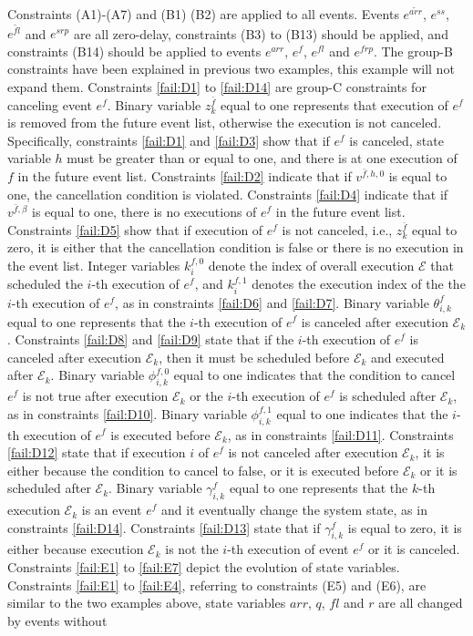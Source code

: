 \documentclass[]{interact}
\theoremstyle{plain}%
\theoremstyle{definition}
\theoremstyle{remark}
\begin{document}
Constraints (A1)-(A7) and (B1) (B2) are applied to all events. Events $e^{\tilde{arr}}$, $e^{ss}$, $e^{\tilde{fl}}$ and $e^{srp}$ are all zero-delay, constraints (B3) to (B13) should be applied, and constraints (B14) should be applied to events $e^{arr}$, $e^{f}$, $e^{fl}$ and $e^{frp}$. The group-B constraints have been explained in previous two examples, this example will not expand them. Constraints \eqref{fail:D1} to \eqref{fail:D14} are group-C constraints for canceling event $e^{f}$. Binary variable $z^{\bar{f}}_k$ equal to one represents that execution of $e^{f}$ is removed from the future event list, otherwise the execution is not canceled. Specifically, constraints \eqref{fail:D1} and \eqref{fail:D3} show that if $e^{f}$ is canceled, state variable $h$ must be greater than or equal to one, and there is at one execution of $f$ in the future event list. Constraints \eqref{fail:D2} indicate that if $v^{\bar{f},h,0}$ is equal to one, the cancellation condition is violated. Constraints \eqref{fail:D4} indicate that if $v^{\bar{f},\beta}$ is equal to one, there is no executions of $e^{f}$ in the future event list. Constraints \eqref{fail:D5} show that if execution of $e^{f}$ is not canceled, i.e., $z^{\bar{f}}_k$ equal to zero, it is either that the cancellation condition is false or there is no execution in the event list. Integer variables $k^{f,0}_i$ denote the index of overall execution $\mathcal{E}$ that scheduled the $i$-th execution of $e^{f}$, and $k^{f,1}_i$ denotes the execution index of the the $i$-th execution of $e^{f}$, as in constraints \eqref{fail:D6} and \eqref{fail:D7}. Binary variable $\theta^{f}_{i,k}$ equal to one represents that the $i$-th execution of $e^{f}$ is canceled after execution $\mathcal{E}_k$. Constraints \eqref{fail:D8} and \eqref{fail:D9} state that if the $i$-th execution of $e^{f}$ is canceled after execution $\mathcal{E}_k$, then it must be scheduled before $\mathcal{E}_k$ and executed after $\mathcal{E}_k$. Binary variable $\phi^{f,0}_{i,k}$ equal to one indicates that the condition to cancel $e^{f}$ is not true after execution $\mathcal{E}_k$ or the $i$-th execution of $e^{f}$ is scheduled after $\mathcal{E}_k$, as in constraints \eqref{fail:D10}. Binary variable $\phi^{f,1}_{i,k}$ equal to one indicates that the $i$-th execution of $e^{f}$ is executed before $\mathcal{E}_k$, as in constraints \eqref{fail:D11}. Constraints \eqref{fail:D12} state that if execution $i$ of $e^{f}$ is not canceled after execution $\mathcal{E}_k$, it is either because the condition to cancel to false, or it is executed before $\mathcal{E}_k$ or it is scheduled after $\mathcal{E}_k$. Binary variable $\gamma^{f}_{i,k}$ equal to one represents that the $k$-th execution $\mathcal{E}_k$ is an event $e^{f}$ and it eventually change the system state, as in constraints \eqref{fail:D14}. Constraints \eqref{fail:D13} state that if $\gamma^{f}_{i,k}$ is equal to zero, it is either because execution $\mathcal{E}_k$ is not the $i$-th execution of event $e^{f}$ or it is canceled. Constraints \eqref{fail:E1} to \eqref{fail:E7} depict the evolution of state variables. Constraints \eqref{fail:E1} to \eqref{fail:E4}, referring to constraints (E5) and (E6), are similar to the two examples above, state variables $arr$, $q$, $fl$ and $r$ are all changed by events without 
\end{document}
